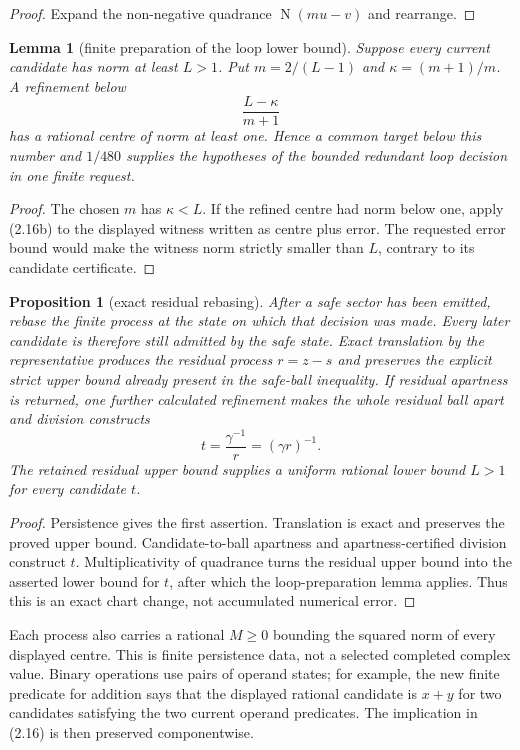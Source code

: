 \documentclass[10pt]{article}
\newtheorem{lemma}[theorem]{Lemma}
\newtheorem{proposition}[theorem]{Proposition}
\theoremstyle{definition}
\theoremstyle{remark}
\newcommand{\Norm}{\operatorname{N}}
\begin{document}
\begin{proof}
Expand the non-negative quadrance $\Norm(mu-v)$ and rearrange.
\end{proof}

\begin{lemma}[finite preparation of the loop lower bound]
Suppose every current candidate has norm at least $L>1$.  Put
$m=2/(L-1)$ and $\kappa=(m+1)/m$.  A refinement below
\[
 \frac{L-\kappa}{m+1}
\]
has a rational centre of norm at least one.  Hence a common target below this
number and $1/480$ supplies the hypotheses of the bounded redundant loop
decision in one finite request.
\end{lemma}

\begin{proof}
The chosen $m$ has $\kappa<L$.  If the refined centre had norm below one, apply
(2.16b) to the displayed witness written as centre plus error.  The requested
error bound would make the witness norm strictly smaller than $L$, contrary
to its candidate certificate.
\end{proof}

\begin{proposition}[exact residual rebasing]
After a safe sector has been emitted, rebase the finite process at the
state on which that decision was made.  Every later candidate is therefore
still admitted by the safe state.  Exact translation by the representative
produces the residual process $r=z-s$ and preserves the explicit strict upper
bound already present in the safe-ball inequality.  If residual apartness is
returned, one further calculated refinement makes the whole residual ball
apart and division constructs
\[
 t=\frac{\gamma^{-1}}r=(\gamma r)^{-1}.
\]
The retained residual upper bound supplies a uniform rational lower bound
$L>1$ for every candidate $t$.
\end{proposition}

\begin{proof}
Persistence gives the first assertion.  Translation is exact and preserves
the proved upper bound.  Candidate-to-ball apartness and
apartness-certified division construct $t$.  Multiplicativity of quadrance
turns the residual upper bound into the asserted lower bound for $t$, after
which the loop-preparation lemma applies.  Thus this is an exact chart
change, not accumulated numerical error.
\end{proof}

Each process also carries a rational $M\ge0$ bounding the squared norm of every
displayed centre.  This is finite persistence data, not a selected completed
complex value.  Binary operations use pairs of operand states; for example,
the new finite predicate for addition says that the displayed rational
candidate is $x+y$ for two candidates satisfying the two current operand
predicates.  The implication in (2.16) is then preserved componentwise.
\end{document}
